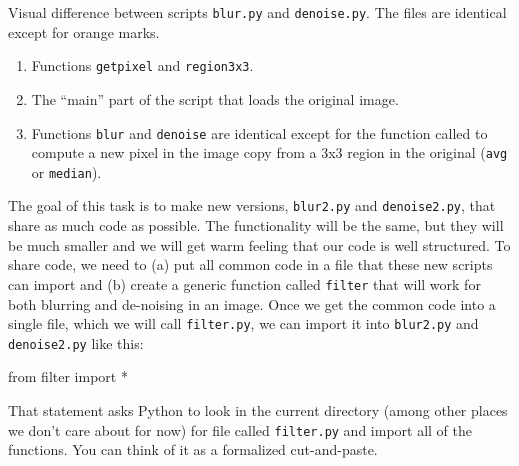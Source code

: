 \begin{marginfigure}
\begin{center}
\end{center}
\caption{Visual difference between scripts {\tt blur.py} and {\tt denoise.py}. The files are identical except for orange marks.}
\label{vizdiff}
\end{marginfigure}

\begin{enumerate}
\item Functions {\tt getpixel} and {\tt region3x3}.
\item The ``main'' part of the script that loads the original image.
\item Functions {\tt blur} and {\tt denoise} are identical except for the function called to compute a new pixel in the image copy from a 3x3 region in the original ({\tt avg} or {\tt median}).
\end{enumerate}

The goal of this task is to make new versions, {\tt blur2.py} and {\tt denoise2.py}, that share as much code as possible.  The functionality will be the same, but they will be much smaller and we will get warm feeling that our code is well structured. To share code, we need to (a) put all common code in a file that these new scripts can import and (b) create a generic function called {\tt filter} that will work for both blurring and de-noising in an image. Once we get the common code into a single file, which we will call {\tt filter.py}, we can import it into {\tt blur2.py} and {\tt denoise2.py} like this:
 
\begin{pyverbatim}
from filter import *
\end{pyverbatim}

\noindent That statement asks Python to look in the current directory (among other places we don't care about for now) for file called {\tt filter.py} and import all of the functions. You can think of it as a formalized cut-and-paste.


